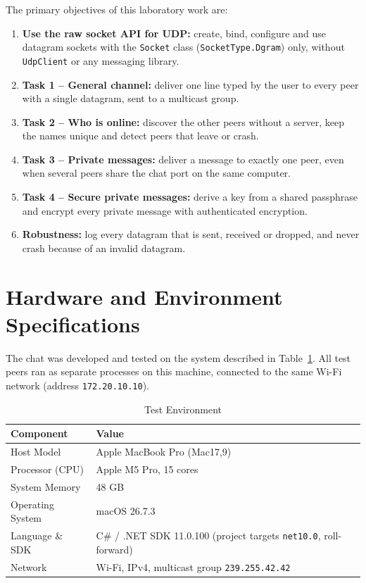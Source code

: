 \documentclass[11pt, a4paper]{article}
\begin{document}
The primary objectives of this laboratory work are:
\begin{enumerate}
    \item \textbf{Use the raw socket API for UDP:} create, bind, configure and use datagram sockets with the \texttt{Socket} class (\texttt{SocketType.Dgram}) only, without \texttt{UdpClient} or any messaging library.
    \item \textbf{Task 1 -- General channel:} deliver one line typed by the user to every peer with a single datagram, sent to a multicast group.
    \item \textbf{Task 2 -- Who is online:} discover the other peers without a server, keep the names unique and detect peers that leave or crash.
    \item \textbf{Task 3 -- Private messages:} deliver a message to exactly one peer, even when several peers share the chat port on the same computer.
    \item \textbf{Task 4 -- Secure private messages:} derive a key from a shared passphrase and encrypt every private message with authenticated encryption.
    \item \textbf{Robustness:} log every datagram that is sent, received or dropped, and never crash because of an invalid datagram.
\end{enumerate}

\section{Hardware and Environment Specifications}
The chat was developed and tested on the system described in Table~\ref{tab:hardware_specs}. All test peers ran as separate processes on this machine, connected to the same Wi-Fi network (address \texttt{172.20.10.10}).

\begin{table}[h]
\centering
\caption{Test Environment}
\label{tab:hardware_specs}
\begin{tabular}{@{}ll@{}}
\toprule
\textbf{Component} & \textbf{Value} \\ \midrule
Host Model & Apple MacBook Pro (Mac17,9) \\
Processor (CPU) & Apple M5 Pro, 15 cores \\
System Memory & 48 GB \\
Operating System & macOS 26.7.3 \\
Language \& SDK & C\# / .NET SDK 11.0.100 (project targets \texttt{net10.0}, roll-forward) \\
Network & Wi-Fi, IPv4, multicast group \texttt{239.255.42.42} \\ \bottomrule
\end{tabular}
\end{table}
\end{document}
